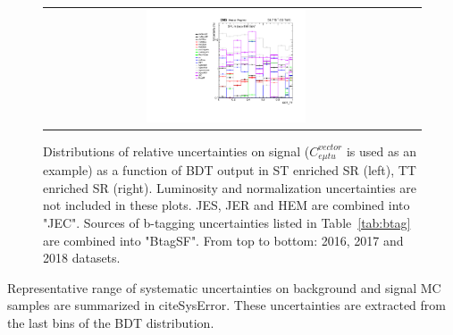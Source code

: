 \begin{figure}[tbh!]
\begin{center}
\begin{tabular}{cc}
  \includegraphics[width=0.45\textwidth]{figures/Part3/Systematics/sysBDT_TT_sig_2018} \\
 \end{tabular}
 \caption{Distributions of relative uncertainties on signal ($C_{e\mu tu}^{vector}$ is used as an example) as a function of BDT output in ST enriched SR (left), TT enriched SR (right). Luminosity and normalization uncertainties are not included in these plots. JES, JER and HEM are combined into "JEC". Sources of b-tagging uncertainties listed in Table~\ref{tab:btag} are combined into "BtagSF". From top to bottom: 2016, 2017 and 2018 datasets.}
 \label{fig:Comp_sys_signal}
 \end{center}
\end{figure}

Representative range of systematic uncertainties on background and signal MC samples are summarized in cite{SysError}. These uncertainties are extracted from the last bins of the BDT distribution.